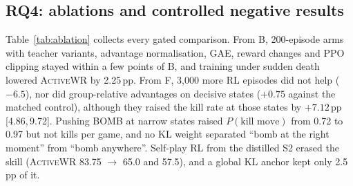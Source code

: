 \documentclass[conference]{IEEEtran}
\newcommand{\awr}{\textsc{ActiveWR}}
\newcommand{\pp}{\,pp}
\newcommand{\ci}[2]{[#1,\,#2]}
\begin{document}
\subsection{RQ4: ablations and controlled negative results}
\label{sec:rq4}
Table~\ref{tab:ablation} collects every gated comparison. From B, 200-episode arms with teacher variants, advantage normalisation, GAE, reward changes and PPO clipping stayed within a few points of B, and training under sudden death lowered \awr{} by 2.25\pp{}. From F, 3{,}000 more RL episodes did not help ($-6.5$), nor did group-relative advantages on decisive states ($+0.75$ against the matched control), although they raised the kill rate at those states by $+7.12$\pp{} \ci{4.86}{9.72}. Pushing BOMB at narrow states raised $P(\text{kill move})$ from 0.72 to 0.97 but not kills per game, and no KL weight separated ``bomb at the right moment'' from ``bomb anywhere''. Self-play RL from the distilled S2 erased the skill (\awr{} 83.75 $\rightarrow$ 65.0 and 57.5), and a global KL anchor kept only 2.5\pp{} of it.
\end{document}
